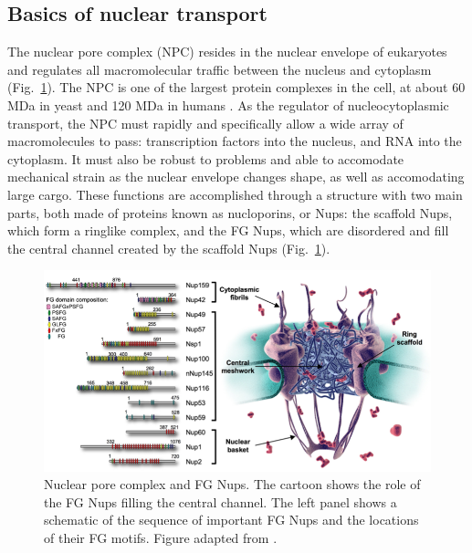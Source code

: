 \subsection{Basics of nuclear transport}

The nuclear pore complex (NPC) resides in the nuclear envelope of eukaryotes and regulates all macromolecular traffic between the nucleus and cytoplasm (Fig.~\ref{fig:NPC}).  The NPC is one of the largest protein complexes in the cell, at about 60 MDa in yeast and 120 MDa in humans \cite{beck17}.  As the regulator of nucleocytoplasmic transport, the NPC must rapidly and specifically allow a wide array of macromolecules to pass: transcription factors into the nucleus, and RNA into the cytoplasm.  It must also be robust to problems and able to accomodate mechanical strain as the nuclear envelope changes shape, as well as accomodating large cargo.  These functions are accomplished through a structure with two main parts, both made of proteins known as nucloporins, or Nups: the scaffold Nups, which form a ringlike complex, and the FG Nups, which are disordered and fill the central channel created by the scaffold Nups (Fig.~\ref{fig:NPC}).  

\begin{figure}
\centering
\includegraphics[width=\textwidth]{figs/ch01/patel.pdf}
\caption[Nuclear pore complex and FG Nups.]{Nuclear pore complex and FG Nups.  The cartoon shows the role of the FG Nups filling the central channel.  The left panel shows a schematic of the sequence of important FG Nups and the locations of their FG motifs. Figure adapted from \cite{patel07}.}
\label{fig:NPC}
\end{figure}


